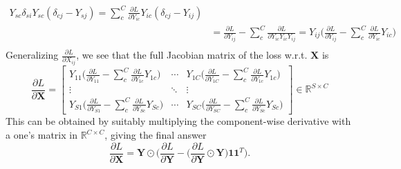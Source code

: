 \documentclass[11pt]{article}
\begin{document}
\begin{enumerate}[label=1\alph*]
\begin{align*}
{                           Y_{sc}}\delta_{si}Y_{sc}(\delta_{cj} - Y_{sj}) =
                           \sum_c^C\frac{\partial L}{\partial Y_{ic}}Y_{ic}(\delta_{cj} -
                           Y_{ij}) \\
                                            &= \frac{\partial L}{\partial
                                              Y_{ij}}-\sum_c^C\frac{\partial
                                              L}{\partial Y_{ic}Y_{ic}Y_{ij}}
                                              = Y_{ij}{\Big(\frac{\partial L}{\partial
                                              Y_{ij}}-\sum_c^C\frac{\partial
                                              L}{\partial Y_{ic}}Y_{ic}\Big)} \\
  \end{align*}
  Generalizing $\frac{\partial L}{\partial X_{ij}}$, we see that the full Jacobian
  matrix of the loss w.r.t. $\mathbf{X}$ is
  \[
    \frac{\partial L}{\partial \mathbf{X}} =
    \begin{bmatrix}
      Y_{11}{\Big(\frac{\partial L}{\partial Y_{11}}-\sum_c^C\frac{\partial L}{\partial
      Y_{1c}}Y_{1c}\Big)} & \cdots & Y_{1C}{\Big(\frac{\partial L}{\partial Y_{1C}}-\sum_c^C\frac{\partial L}{\partial
      Y_{1c}}Y_{1c}\Big)} \\
      \vdots & \ddots & \vdots \\
      Y_{S1}{\Big(\frac{\partial L}{\partial Y_{S1}}-\sum_c^C\frac{\partial L}{\partial
      Y_{Sc}}Y_{Sc}\Big)} & \cdots & Y_{SC}{\Big(\frac{\partial L}{\partial Y_{SC}}-\sum_c^C\frac{\partial L}{\partial
      Y_{Sc}}Y_{Sc}\Big)}
    \end{bmatrix}
    \in \mathbb{R}^{S\times C}
  \]
  This can be obtained by suitably multiplying the component-wise
  derivative with a one's matrix in $\mathbb{R}^{C\times C}$, giving the final answer
  \[
    \frac{\partial L}{\partial \mathbf{X}} = \mathbf{Y}\odot{\Big(\frac{\partial L}{\partial
        \mathbf{Y}}-\Big(\frac{\partial L}{\partial
        \mathbf{Y}}\odot\mathbf{Y}\Big)\mathbf{1}\mathbf{1}^T\Big)}.
  \]


\end{enumerate}
\end{document}
